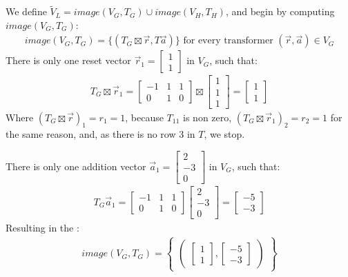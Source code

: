 We define $\tilde{V}_L = image(V_G, T_G) \cup image(V_H, T_H)$, and begin by computing $image(V_G, T_G)$:
\begin{align*}
	image(V_G, T_G) = \{(T_G\boxtimes\vec{r}, T\vec{a})\} \text{ for every transformer } (\vec{r}, \vec{a}) \in V_G
\end{align*}
There is only one reset vector $\vec{r}_1 = \begin{bmatrix}1 \\ 1 \end{bmatrix}$ in $V_G$, such that:
\begin{align*}
	T_G\boxtimes\vec{r}_1 = \begin{bmatrix}  -1 & 1 & 1 \\ 0 & 1 & 0\end{bmatrix} \boxtimes \begin{bmatrix} 1 \\ 1 \\ 1\end{bmatrix} = \begin{bmatrix}  1 \\ 1\end{bmatrix}
\end{align*}
Where $(T_G\boxtimes\vec{r})_1 = r_1 = 1$, because $T_{11}$ is non zero, $(T_G\boxtimes\vec{r}_1)_2 = r_2 = 1$ for the same reason, and, as there is no row 3 in $T$, we stop. \\ \par
There is only one addition vector $\vec{a}_1 =  \begin{bmatrix}2 \\ -3 \\ 0\end{bmatrix}$ in $V_G$, such that:
\begin{align*}
	T_G\vec{a}_1 = \begin{bmatrix}  -1 & 1 & 1 \\ 0 & 1 & 0\end{bmatrix} \begin{bmatrix} 2 \\ -3 \\ 0\end{bmatrix} = \begin{bmatrix} -5 \\ -3 \end{bmatrix}
\end{align*}
Resulting in the \qvasr:
\begin{align*}
	image(V_G, T_G) = 
	\begin{Bmatrix}
		\begin{pmatrix}
			\begin{bmatrix}
				1 \\
				1 
			\end{bmatrix},
			\begin{bmatrix}
				-5 \\
				-3 
			\end{bmatrix}
		\end{pmatrix}
	\end{Bmatrix}
\end{align*} \par
